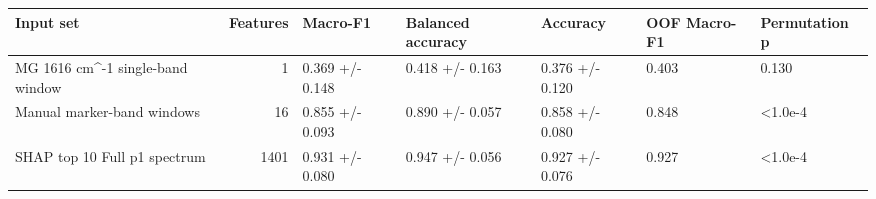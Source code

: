 \begin{tabular}{lrlllll}
\toprule
Input set & Features & Macro-F1 & Balanced accuracy & Accuracy & OOF Macro-F1 & Permutation p \\
\midrule
MG 1616 cm^-1 single-band window & 1 & 0.369 +/- 0.148 & 0.418 +/- 0.163 & 0.376 +/- 0.120 & 0.403 & 0.130 \\
Manual marker-band windows & 16 & 0.855 +/- 0.093 & 0.890 +/- 0.057 & 0.858 +/- 0.080 & 0.848 & <1.0e-4 \\
SHAP top 10%
Full p1 spectrum & 1401 & 0.931 +/- 0.080 & 0.947 +/- 0.056 & 0.927 +/- 0.076 & 0.927 & <1.0e-4 \\
\bottomrule
\end{tabular}
